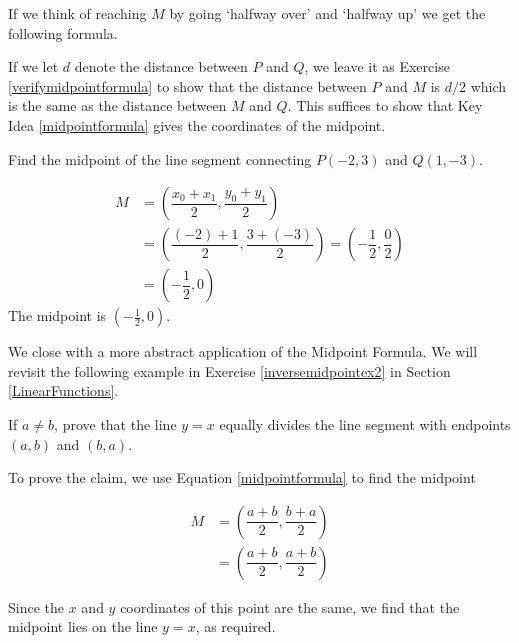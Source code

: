 If we think of reaching $M$ by going `halfway over' and `halfway up' we get the following formula. 

\medskip


\medskip

If we let $d$ denote the distance between $P$ and $Q$, we leave it as Exercise \ref{verifymidpointformula} to show that the distance between $P$ and $M$ is $d/2$ which is the same as the distance between $M$ and $Q$.  This suffices to show that Key Idea \ref{midpointformula} gives the coordinates of the midpoint.

\medskip

{
Find the midpoint of the line segment connecting $P(-2,3)$ and  $Q(1,-3)$.  
}
{

\begin{align*}
 M & = \left( \dfrac{x_{0}+x_{1}}{2},  \dfrac{y_{0}+y_{1}}{2} \right) \\
   & = \left( \dfrac{(-2)+1}{2},  \dfrac{3+(-3)}{2} \right)  = \left(- \dfrac{1}{2}, \dfrac{0}{2} \right) \\
   & = \left(- \dfrac{1}{2}, 0 \right) 
\end{align*}   
The midpoint is  $\left(- \frac{1}{2}, 0 \right)$.}

\medskip


\label{inversemidpoint}

We close with a more abstract application of the Midpoint Formula.  We will revisit the following example in Exercise \ref{inversemidpointex2} in Section \ref{LinearFunctions}.  

\medskip

{
If $a \neq b$, prove that the line $y = x$ equally divides the line segment with endpoints $(a,b)$ and $(b,a)$.
}
{
To prove the claim, we use Equation \ref{midpointformula} to find the midpoint  


\begin{align*}
 M & =  \left( \dfrac{a+b}{2},  \dfrac{b+a}{2} \right) \\
   & =  \left( \dfrac{a+b}{2},  \dfrac{a+b}{2} \right)
\end{align*}

Since the $x$ and $y$ coordinates of this point are the same, we find that the midpoint lies on the line $y=x$, as required. 
}

{}
